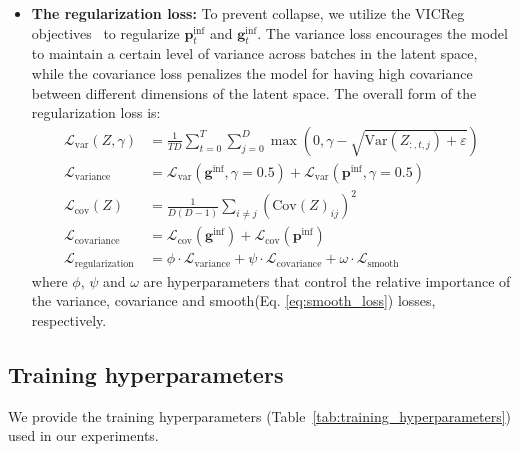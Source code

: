 \begin{itemize}
    \item \textbf{The regularization loss:} To prevent collapse, we utilize the VICReg objectives~\citep{bardes2022vicreg} to regularize $\boldsymbol{p}_t^{\text{inf}}$ and $\boldsymbol{g}_t^{\text{inf}}$. The variance loss encourages the model to maintain a certain level of variance across batches in the latent space, while the covariance loss penalizes the model for having high covariance between different dimensions of the latent space. The overall form of the regularization loss is:
    \begin{align}
        \mathcal{L}_{\text{var}}(Z, \gamma) &= \frac{1}{TD} \sum_{t=0}^{T} \sum_{j=0}^{D} \max\left(0, \gamma - \sqrt{\text{Var}(Z_{:,t,j}) + \varepsilon} \right) \\
        \mathcal{L}_{\text{variance}} &= \mathcal{L}_{\text{var}}(\boldsymbol{g}^{\text{inf}}, \gamma=0.5) + \mathcal{L}_{\text{var}}(\boldsymbol{p}^{\text{inf}}, \gamma=0.5) \\
        \mathcal{L}_{\text{cov}}(Z) &= \frac{1}{D(D-1)} \sum_{i \neq j} (\text{Cov}(Z)_{ij})^2 \\
        \mathcal{L}_{\text{covariance}} &= \mathcal{L}_{\text{cov}}(\boldsymbol{g}^{\text{inf}}) + \mathcal{L}_{\text{cov}}(\boldsymbol{p}^{\text{inf}}) \\
        \mathcal{L}_{\text{regularization}} &= \phi \cdot \mathcal{L}_{\text{variance}} + \psi \cdot \mathcal{L}_{\text{covariance}} + \omega \cdot \mathcal{L}_{\text{smooth}}
    \end{align}
    where $\phi$, $\psi$ and $\omega$ are hyperparameters that control the relative importance of the variance, covariance and smooth(Eq. \ref{eq:smooth_loss}) losses, respectively.

\end{itemize}

\subsection{Training hyperparameters}
We provide the training hyperparameters (Table~\ref{tab:training_hyperparameters}) used in our experiments. 

